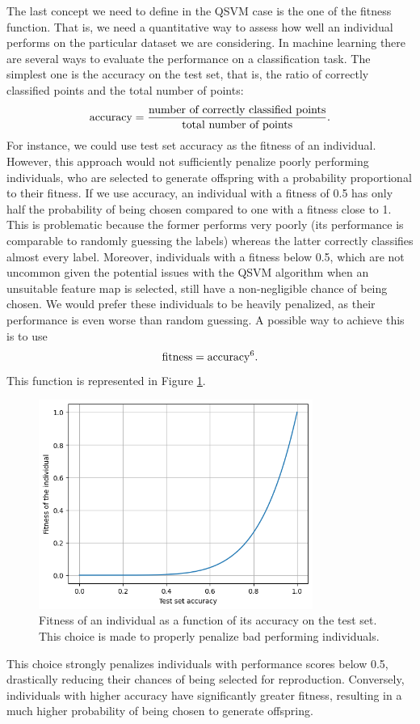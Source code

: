 \documentclass[12pt]{article}
\begin{document}
The last concept we need to define in the QSVM case is the one of the fitness function. That is, we need a quantitative way to assess how well an individual performs on the particular dataset we are considering. In machine learning there are several ways to evaluate the performance on a classification task. The simplest one is the accuracy on the test set, that is, the ratio of correctly classified points and the total number of points:
\begin{equation}
    \textup{accuracy}=\frac{\textup{number of correctly classified points}}{\textup{total number of points}}.
\end{equation}
For instance, we could use test set accuracy as the fitness of an individual. However, this approach would not sufficiently penalize poorly performing individuals, who are selected to generate offspring with a probability proportional to their fitness. If we use accuracy, an individual with a fitness of 0.5 has only half the probability of being chosen compared to one with a fitness close to 1. This is problematic because the former performs very poorly (its performance is comparable to randomly guessing the labels) whereas the latter correctly classifies almost every label. Moreover, individuals with a fitness below 0.5, which are not uncommon given the potential issues with the QSVM algorithm when an unsuitable feature map is selected, still have a non-negligible chance of being chosen. We would prefer these individuals to be heavily penalized, as their performance is even worse than random guessing. A possible way to achieve this is to use
\begin{equation}
    \textup{fitness}=\textup{accuracy}^6.
    \label{accuracy}
\end{equation}
This function is represented in Figure \ref{fig:fitness function}.
\begin{figure}[h!]
    \centering
    \includegraphics[width=0.8\textwidth]{images/sigmoid.png}
    \caption{Fitness of an individual as a function of its accuracy on the test set. This choice is made to properly penalize bad performing individuals.}
    \label{fig:fitness function}
\end{figure}
This choice strongly penalizes individuals with performance scores below 0.5, drastically reducing their chances of being selected for reproduction. Conversely, individuals with higher accuracy have significantly greater fitness, resulting in a much higher probability of being chosen to generate offspring.
\end{document}
